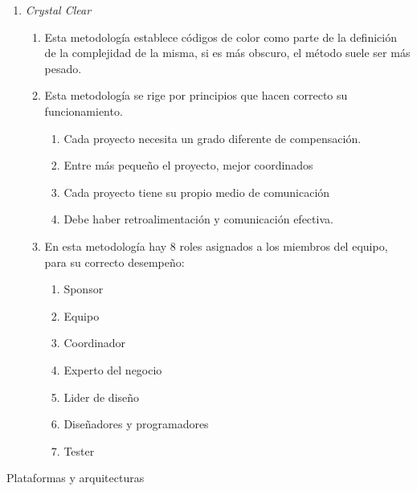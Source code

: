 \documentclass{article} %
\begin{document}
\begin{enumerate}
\item  \textit{Crystal Clear}

\begin{enumerate}
\item \textit{ }Esta metodolog\'{i}a establece c\'{o}digos de color como parte de la definici\'{o}n de la complejidad de la misma, si es m\'{a}s obscuro, el m\'{e}todo suele ser m\'{a}s pesado. 

\item  Esta metodolog\'{i}a se rige por principios que hacen correcto su funcionamiento.

\begin{enumerate}
\item  Cada proyecto necesita un grado diferente de compensaci\'{o}n.

\item  Entre m\'{a}s peque\~{n}o el proyecto, mejor coordinados

\item  Cada proyecto tiene su propio medio de comunicaci\'{o}n

\item  Debe haber retroalimentaci\'{o}n y comunicaci\'{o}n efectiva.
\end{enumerate}

\item  En esta metodolog\'{i}a hay 8 roles asignados a los miembros del equipo, para su correcto desempe\~{n}o:

\begin{enumerate}
\item  Sponsor

\item  Equipo

\item  Coordinador

\item  Experto del negocio

\item  Lider de dise\~{n}o

\item  Dise\~{n}adores y programadores

\item  Tester
\end{enumerate}
\end{enumerate}
\end{enumerate}

\noindent Plataformas y arquitecturas
\end{document}
